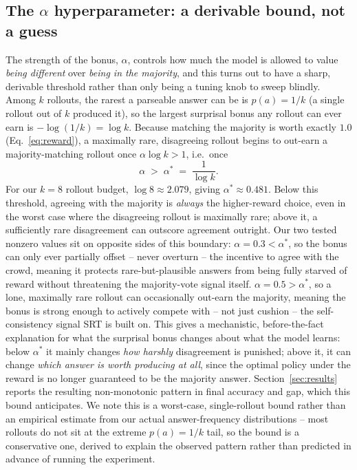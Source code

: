 \documentclass{article}
\begin{document}
\subsection{The $\alpha$ hyperparameter: a derivable bound, not a guess}
\label{sec:alpha-bound}

The strength of the bonus, $\alpha$, controls how much the model is allowed
to value \emph{being different} over \emph{being in the majority}, and this
turns out to have a sharp, derivable threshold rather than only being a
tuning knob to sweep blindly. Among $k$ rollouts, the rarest a parseable
answer can be is $p(a) = 1/k$ (a single rollout out of $k$ produced it), so
the largest surprisal bonus any rollout can ever earn is
$-\log(1/k) = \log k$. Because matching the majority is worth exactly $1.0$
(Eq.~\ref{eq:reward}), a maximally rare, disagreeing rollout begins to
out-earn a majority-matching rollout once $\alpha \log k > 1$, i.e.\ once
\[
\alpha \;>\; \alpha^{*} \;=\; \frac{1}{\log k}.
\]
For our $k{=}8$ rollout budget, $\log 8 \approx 2.079$, giving
$\alpha^{*} \approx 0.481$. Below this threshold, agreeing with the majority
is \emph{always} the higher-reward choice, even in the worst case where the
disagreeing rollout is maximally rare; above it, a sufficiently rare
disagreement can outscore agreement outright. Our two tested nonzero values
sit on opposite sides of this boundary: $\alpha{=}0.3 < \alpha^{*}$, so the
bonus can only ever partially offset -- never overturn -- the incentive to
agree with the crowd, meaning it protects rare-but-plausible answers from
being fully starved of reward without threatening the majority-vote signal
itself. $\alpha{=}0.5 > \alpha^{*}$, so a lone, maximally rare rollout can
occasionally out-earn the majority, meaning the bonus is strong enough to
actively compete with -- not just cushion -- the self-consistency signal SRT
is built on. This gives a mechanistic, before-the-fact explanation for what
the surprisal bonus changes about what the model learns: below $\alpha^{*}$
it mainly changes \emph{how harshly} disagreement is punished; above it, it
can change \emph{which answer is worth producing at all}, since the
optimal policy under the reward is no longer guaranteed to be the majority
answer. Section~\ref{sec:results} reports the resulting non-monotonic
pattern in final accuracy and gap, which this bound anticipates. We note
this is a worst-case, single-rollout bound rather than an empirical estimate
from our actual answer-frequency distributions -- most rollouts do not sit
at the extreme $p(a){=}1/k$ tail, so the bound is a conservative one, derived
to explain the observed pattern rather than predicted in advance of running
the experiment.
\end{document}

